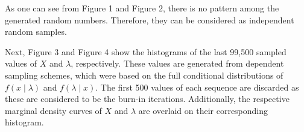 \documentclass[11pt, oneside]{article}
\begin{document}
\begin{figure}[h]
\begin{minipage}{0.45\textwidth}
     \end{minipage}
\end{figure}

As one can see from Figure 1 and Figure 2, there is no pattern among the generated random numbers. Therefore, they can be considered as independent random samples.

Next, Figure 3 and Figure 4 show the histograms of the last 99,500 sampled values of $X$ and $\lambda$, respectively. These values are generated from dependent sampling schemes, which were based on the full conditional distributions of $f(x\mid\lambda)$ and $f(\lambda\mid x)$. The first 500 values of each sequence are discarded as these are considered to be the burn-in iterations. Additionally, the respective marginal density curves of $X$ and $\lambda$ are overlaid on their corresponding histogram. 
\end{document}
